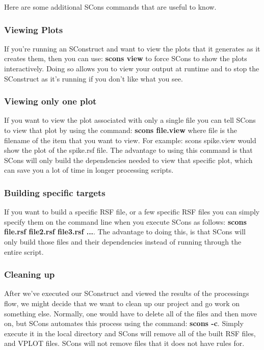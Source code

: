Here are some additional SCons commands that are useful to know.

\subsubsection{Viewing Plots}

If you're running an SConstruct and want to view the plots that it generates as it creates them, then you can use: \textbf{scons view} to force SCons to show the plots interactively.  Doing so allows you to view your output at runtime and to stop the SConstruct as it's running if you don't like what you see.

\subsubsection{Viewing only one plot}

If you want to view the plot associated with only a single file you can tell SCons to view that plot by using the command: \textbf{scons file.view} where file is the filename of the item that you want to view.  For example: scons spike.view would show the plot of the spike.rsf file.  The advantage to using this command is that SCons will only build the dependencies needed to view that specific plot, which can save you a lot of time in longer processing scripts.

\subsubsection{Building specific targets}

If you want to build a specific RSF file, or a few specific RSF files you can simply specify them on the command line when you execute SCons as follows: \textbf{scons file.rsf file2.rsf file3.rsf ...}.  The advantage to doing this, is that SCons will only build those files and their dependencies instead of running through the entire script.

\subsubsection{Cleaning up}

After we've executed our SConstruct and viewed the results of the processings flow, we might decide that we want to clean up our project and go work on something else.  Normally, one would have to delete all of the files and then move on, but SCons automates this process using the command: \textbf{scons -c}.  Simply execute it in the local directory and SCons will remove all of the built RSF files, and VPLOT files.  SCons will not remove files that it does not have rules for.

